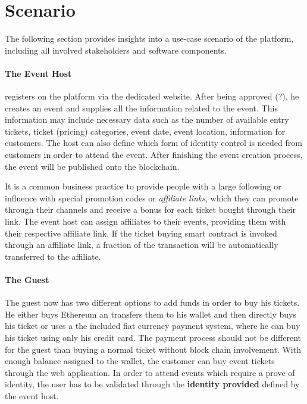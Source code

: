 \section{Scenario}
The following section provides insights into a use-case scenario of the platform, including all involved stakeholders and software components.

\paragraph{The Event Host} registers on the platform via the dedicated website. After being approved (?), he creates an event and supplies all the information related to the event. This information may include necessary data such as the number of available entry tickets, ticket (pricing) categories, event date, event location, information for customers. The host can also define which form of identity control is needed from customers in order to attend the event. After finishing the event creation process, the event will be published onto the blockchain.

It is a common business practice to provide people with a large following or influence with special promotion codes or \textit{affiliate links}, which they can promote through their channels and receive a bonus for each ticket bought through their link. The event host can assign affiliates to their events, providing them with their respective affiliate link. If the ticket buying smart contract is invoked through an affiliate link, a fraction of the transaction will be automatically transferred to the affiliate.  

\paragraph{The Guest} %
The guest now has two different options to add funds in order to buy his tickets. He either buys Ethereum an transfers them to his wallet and then directly buys his ticket or uses a the included fiat currency payment system, where he can buy his ticket using only his credit card.
The payment process should not be different for the guest than buying a normal ticket without block chain involvement.
With enough balance assigned to the wallet, the customer can buy event tickets through the web application.
In order to attend events which require a prove of identity, the user has to be validated through the \textbf{identity provided} defined by the event host.

